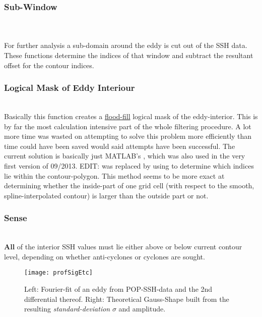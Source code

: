 \subsubsection{Sub-Window}
\\
\\
For further analysis a sub-domain around the eddy is cut out of the SSH data.
These functions determine the indices of that window and subtract the
resultant offset for the contour indices.
\subsubsection{Logical Mask of Eddy Interiour}\label{filter:cutmask}
\\
Basically this function creates a
\href{http://en.wikipedia.org/wiki/Flood_fill}{flood-fill} logical mask of the
eddy-interior. This is by far the most calculation intensive part of the whole
filtering procedure. A lot more time was wasted on attempting to solve this
problem more efficiently than time could have been saved would said attempts
have
been successful. The current solution is basically just MATLAB's
, which was also used in the very first version of 09/2013.
EDIT:  was replaced by using  to determine which indices lie within the contour-polygon. This method seems to be more exact at determining whether the inside-part of one grid cell (with respect to the smooth, spline-interpolated contour) is larger than the outside part or not.
\subsubsection{Sense}
\\
\textbf{All} of the interior SSH values must lie either above or below current
contour level, depending on whether anti-cyclones or cyclones are sought.
\begin{figure}
	\texttt{[image: profSigEtc]}
	\caption{Left: Fourier-fit of an eddy from POP-SSH-data and the 2nd differential thereof. Right: Theoretical Gauss-Shape built from the resulting \textit{standard-deviation} \ie $\sigma$ and amplitude.}
	\label{fig:profSigEtc}
\end{figure}
